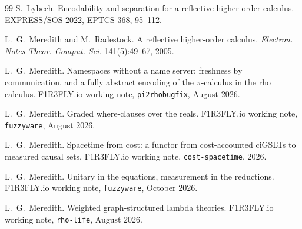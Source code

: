 \documentclass[11pt,a4paper]{article}
\theoremstyle{plain}
\theoremstyle{definition}
\theoremstyle{remark}
\begin{document}
{\begin{thebibliography}{99}
 S.~Lybech.
Encodability and separation for a reflective higher-order calculus.
EXPRESS/SOS 2022, EPTCS 368, 95--112.

 L.~G.~Meredith and M.~Radestock.
A reflective higher-order calculus.
\emph{Electron. Notes Theor. Comput. Sci.} 141(5):49--67, 2005.

 L.~G.~Meredith.
Namespaces without a name server: freshness by communication, and a fully
abstract encoding of the $\pi$-calculus in the rho calculus.
F1R3FLY.io working note, \texttt{pi2rhobugfix}, August 2026.

 L.~G.~Meredith.
Graded where-clauses over the reals.
F1R3FLY.io working note, \texttt{fuzzyware}, August 2026.

 L.~G.~Meredith.
Spacetime from cost: a functor from cost-accounted ciGSLTs to measured causal
sets. F1R3FLY.io working note, \texttt{cost-spacetime}, 2026.

 L.~G.~Meredith.
Unitary in the equations, measurement in the reductions.
F1R3FLY.io working note, \texttt{fuzzyware}, October 2026.

 L.~G.~Meredith.
Weighted graph-structured lambda theories.
F1R3FLY.io working note, \texttt{rho-life}, August 2026.

\end{thebibliography}
}
\end{document}
